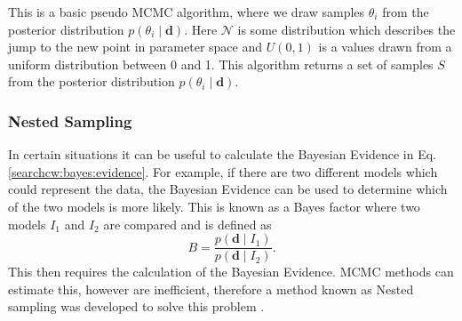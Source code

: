 \begin{algorithm}
	\centering
	\begin{algorithmic}[1]
		 
		 
		\STATE
		
			\ELSE
				\ELSE
				\ENDIF
		\ENDIF
		\ENDFOR
		\STATE

	\end{algorithmic}
	\caption[Simple MCMC algorithm]{This is a basic pseudo MCMC algorithm, where we draw samples $\theta_i$ from the posterior distribution $p(\theta_i \mid \bm{d})$. Here $\mathcal{N}$ is some distribution which describes the jump to the new point in parameter space and $U(0,1)$ is a values drawn from a uniform distribution between 0 and 1. This algorithm returns a set of samples $S$ from the posterior distribution $p(\theta_i \mid \bm{d})$. \label{searchcw:bayes:mcmc_alg}}
\end{algorithm}

%
\subsubsection{\label{searchcw:prob:bayes:nested}Nested Sampling}
%

In certain situations it can be useful to calculate the Bayesian Evidence in Eq.\ref{searchcw:bayes:evidence}.  For example, if there are two
different models which could represent the data, the Bayesian Evidence can be used to
determine which of the two models is more likely.  This is known as a Bayes
factor where two models $I_1$ and $I_2$ are compared and is defined as
%
\begin{equation}
B = \frac{p({\bm d} \mid I_1)}{p({\bm d} \mid I_2)}.
\end{equation}
%
This then requires the calculation of the
Bayesian Evidence. \gls{MCMC} methods can estimate this, however are inefficient, therefore a method known as Nested
sampling was developed to solve this problem \citep{skilling2006NestedSampling,speagle2019DynestyDynamic}.

